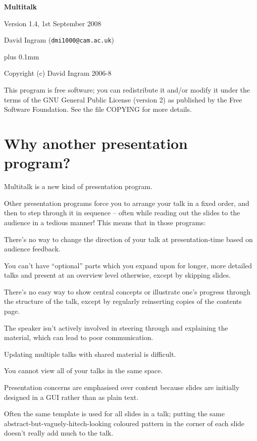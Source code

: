 \documentclass[12pt,a4paper,twoside]{article}
\renewcommand{\_}{\texttt{\symbol{95}}}
\begin{document}
\centerline{\textbf{\LARGE Multitalk}}
\vspace{0.5cm}
\centerline{Version 1.4, 1st September 2008}
\centerline{David Ingram (\texttt{dmi1000@cam.ac.uk})}

{ \parskip -3mm plus 0.1mm \tableofcontents }
\newpage

Copyright (c) David Ingram 2006-8

This program is free software; you can redistribute it and/or modify it
under the terms of the GNU General Public License (version 2) as
published by the Free Software Foundation. See the file COPYING for
more details.

\section{Why another presentation program?}

Multitalk is a new kind of presentation program.

Other presentation programs force you to arrange your talk in a fixed order,
and then to step through it in sequence -- often while reading out the slides to
the audience in a tedious manner! This means that in those programs:

\begin{bulletlist}
\item There's no way to change the direction of your talk at presentation-time
  based on audience feedback.
\item You can't have ``optional'' parts which you expand upon for longer, more
  detailed talks and present at an overview level otherwise, except
  by skipping slides.
\item There's no easy way to show central concepts or illustrate one's
  progress through the structure of the talk, except by regularly
  reinserting copies of the contents page.
\item The speaker isn't actively involved in steering through and explaining
  the material, which can lead to poor communication.
\item Updating multiple talks with shared material is difficult.
\item You cannot view all of your talks in the same space.
\item Presentation concerns are emphasised over content because slides are
  initially designed in a GUI rather than as plain text.
\item Often the same template is used for all slides in a talk; putting
  the same abstract-but-vaguely-hitech-looking coloured pattern in the
  corner of each slide doesn't really add much to the talk.
\end{bulletlist}
\end{document}

